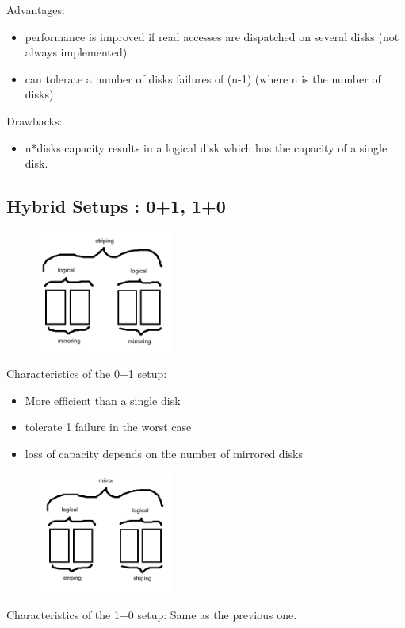 Advantages:

\begin{itemize}
  \item performance is improved if read accesses are dispatched on several disks (not always implemented)
  \item can tolerate a number of disks failures of (n-1) (where n is the number of disks)
\end{itemize}

Drawbacks:

\begin{itemize}
  \item n*disks capacity results in a logical disk which has the capacity of a single disk. 
\end{itemize}

\subsection{Hybrid Setups : 0+1, 1+0}
\begin{figure}[h!]
  \begin{center}
    \includegraphics[width=0.4\textwidth]{0_plus_1.png}
    \caption{}
  \end{center}
\end{figure}

Characteristics of the 0+1 setup:
\begin{itemize}
  \item More efficient than a single disk
  \item tolerate 1 failure in the worst case
  \item loss of capacity depends on the number of mirrored disks
\end{itemize}

\begin{figure}[h!]
  \begin{center}
    \includegraphics[width=0.4\textwidth]{1_plus_0.png}
    \caption{}
  \end{center}
\end{figure}
Characteristics of the 1+0 setup:
Same as the previous one. 

